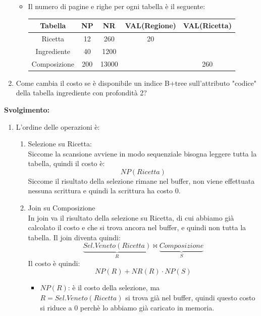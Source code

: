 \documentclass[a4paper]{article}
\begin{document}
\begin{exercise}
\begin{enumerate}
\begin{itemize}
        \item Il numero di pagine e righe per ogni tabella è il seguente:
          \begin{table}[H]
            \centering
            \begin{tabular}{|c|c|c|c|c|}
              \hline
              Tabella & NP & NR & VAL(Regione) & VAL(Ricetta) \\
              \hline
              Ricetta & 12 & 260 & 20 & \\
              Ingrediente & 40 & 1200 &  &  \\
              Composizione & 200 & 13000 &  & 260 \\
              \hline
            \end{tabular}
          \end{table}
      \end{itemize}

    \item Come cambia il costo se è disponibile un indice B+tree
      sull'attributo "codice" della tabella ingrediente con profondità 2?
  \end{enumerate}


  \vspace{1em}
  \noindent
  \textbf{Svolgimento:}
  \begin{enumerate}
    \item L'ordine delle operazioni è:
      \begin{enumerate}
        \item Selezione su Ricetta:\\
          Siccome la scansione avviene in modo sequenziale bisogna leggere tutta
          la tabella, quindi il costo è:
          \[
            NP(Ricetta)
          \] 
          Siccome il risultato della selezione rimane nel buffer, non viene
          effettuata nessuna scrittura e quindi la scrittura ha costo 0.

        \item Join su Composizione\\
          In join va il risultato della selezione su Ricetta, di cui abbiamo
          già calcolato il costo e che si trova ancora nel buffer, e quindi
          non tutta la tabella. Il join diventa quindi:
          \[
            \underbrace{Sel.Veneto(Ricetta)}_{R}
            \bowtie
            \underbrace{Composizione}_{S}
          \] 
          Il costo è quindi:
          \[
            NP(R) + NR(R) \cdot NP(S)
          \] 
          \begin{itemize}
            \item \( NP(R) \): è il costo della selezione, ma \\
              \( R = Sel.Veneto(Ricetta) \) si trova già nel buffer, quindi
              questo costo si riduce a 0 perchè lo abbiamo già caricato in memoria.


\end{itemize}
\end{enumerate}
\end{enumerate}
\end{exercise}
\end{document}
